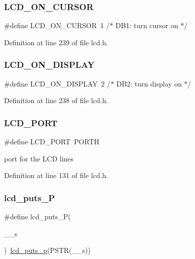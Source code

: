 \subsubsection{\texorpdfstring{LCD\_ON\_CURSOR}{LCD\_ON\_CURSOR}}
{\footnotesize\ttfamily \#define L\+C\+D\+\_\+\+O\+N\+\_\+\+C\+U\+R\+S\+OR~1      /$\ast$   D\+B1\+: turn cursor on               $\ast$/}



Definition at line 239 of file lcd.\+h.

\mbox{\label{group__pfleury__lcd_gae84f634b0a1661c4d5bbaafd9397732a}} 
\subsubsection{\texorpdfstring{LCD\_ON\_DISPLAY}{LCD\_ON\_DISPLAY}}
{\footnotesize\ttfamily \#define L\+C\+D\+\_\+\+O\+N\+\_\+\+D\+I\+S\+P\+L\+AY~2      /$\ast$   D\+B2\+: turn display on              $\ast$/}



Definition at line 238 of file lcd.\+h.

\mbox{\label{group__pfleury__lcd_gabcf42bd88b3c36193f301ca25b033875}} 
\subsubsection{\texorpdfstring{LCD\_PORT}{LCD\_PORT}}
{\footnotesize\ttfamily \#define L\+C\+D\+\_\+\+P\+O\+RT~P\+O\+R\+TH}

port for the L\+CD lines 

Definition at line 131 of file lcd.\+h.

\mbox{\label{group__pfleury__lcd_ga4f1928f1515e21422d5a33af2949f2f7}} 
\subsubsection{\texorpdfstring{lcd\_puts\_P}{lcd\_puts\_P}}
{\footnotesize\ttfamily \#define lcd\+\_\+puts\+\_\+P(\begin{DoxyParamCaption}\item[{}]{\+\_\+\+\_\+s }\end{DoxyParamCaption})~\mbox{\hyperlink{group__pfleury__lcd_ga9022a24a56a9b15681f62eb6ba77e5de}{lcd\+\_\+puts\+\_\+p}}(P\+S\+TR(\+\_\+\+\_\+s))}



